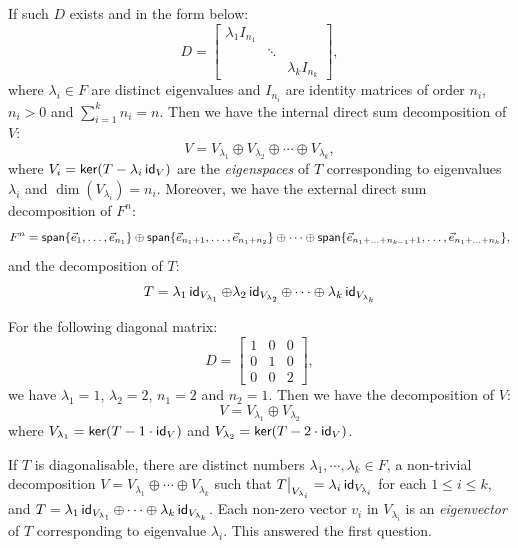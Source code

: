 If such $D$ exists and in the form below:
\[
  D = \begin{bmatrix}
    \lambda_1 I_{n_1} &        &                   \\
                      & \ddots &                   \\
                      &        & \lambda_k I_{n_k}
  \end{bmatrix},
\]
where $\lambda_i \in F$ are distinct eigenvalues and $I_{n_i}$ are identity matrices of order $n_i$, $n_i > 0$ and $\sum_{i = 1}^k n_i = n$. Then we have the internal direct sum decomposition of $V$:
\[
  V = V_{\lambda_1} \oplus V_{\lambda_2} \oplus \cdots \oplus V_{\lambda_k},
\]
where $V_i = \operatorname{\text{\normalfont\sffamily ker}}(T - \lambda_i \operatorname{\text{\normalfont\sffamily id}}_V)$ are the \emph{eigenspaces} of $T$ corresponding to eigenvalues $\lambda_i$ and $\dim(V_{\lambda_i}) = n_i$. Moreover, we have the external direct sum decomposition of $F^n$:
\[
  F^n = \operatorname{\text{\normalfont\sffamily span}} \{ \vec{e}_1, \ldots, \vec{e}_{n_1} \} \oplus \operatorname{\text{\normalfont\sffamily span}} \{ \vec{e}_{n_1 + 1}, \ldots, \vec{e}_{n_1 + n_2} \} \oplus \cdots \oplus \operatorname{\text{\normalfont\sffamily span}} \{ \vec{e}_{n_1 + \ldots + n_{k-1} + 1}, \ldots, \vec{e}_{n_1 + \ldots + n_k} \},
\]
and the decomposition of $T$:
\[
  T = \lambda_1 \operatorname{\text{\normalfont\sffamily id}}_{V_{\lambda_1}} \oplus \lambda_2 \operatorname{\text{\normalfont\sffamily id}}_{V_{\lambda_2}} \oplus \cdots \oplus \lambda_k \operatorname{\text{\normalfont\sffamily id}}_{V_{\lambda_k}}
\]
\begin{example}
  For the following diagonal matrix:
  \[
    D = \begin{bmatrix}
      1 & 0 & 0 \\
      0 & 1 & 0 \\
      0 & 0 & 2
    \end{bmatrix},
  \]
  we have $\lambda_1 = 1$, $\lambda_2 = 2$, $n_1 = 2$ and $n_2 = 1$. Then we have the decomposition of $V$:
  \[
    V = V_{\lambda_1} \oplus V_{\lambda_2}
  \]
  where $V_{\lambda_1} = \operatorname{\text{\normalfont\sffamily ker}}(T - 1 \cdot \operatorname{\text{\normalfont\sffamily id}}_V)$ and $V_{\lambda_2} = \operatorname{\text{\normalfont\sffamily ker}}(T - 2 \cdot \operatorname{\text{\normalfont\sffamily id}}_V)$.
\end{example}

If $T$ is diagonalisable, there are distinct numbers $\lambda_1, \cdots, \lambda_k \in F$, a non-trivial decomposition $V = V_{\lambda_1} \oplus \cdots \oplus V_{\lambda_k}$ such that $T\big|_{V_{\lambda_i}} = \lambda_i \operatorname{\text{\normalfont\sffamily id}}_{V_{\lambda_i}}$ for each $1 \leq i \leq k$, and $T = \lambda_1 \operatorname{\text{\normalfont\sffamily id}}_{V_{\lambda_1}} \oplus \cdots \oplus \lambda_k \operatorname{\text{\normalfont\sffamily id}}_{V_{\lambda_k}}$. Each non-zero vector $v_i$ in $V_{\lambda_i}$ is an \emph{eigenvector} of $T$ corresponding to eigenvalue $\lambda_i$. This answered the first question.

